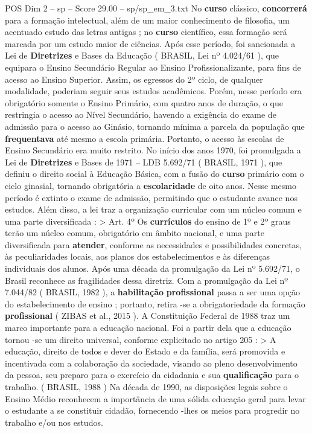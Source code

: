 \begin{textsample}{POS Dim 2 – sp – Score 29.00 – sp/sp\_em\_3.txt}
No \textbf{curso} clássico, \textbf{concorrerá} para a formação intelectual, além de um maior conhecimento de filosofia, um acentuado estudo das letras antigas ; no \textbf{curso} científico, essa formação será marcada por um estudo maior de ciências.
Após esse período, foi sancionada a Lei de \textbf{Diretrizes} e Bases da Educação ( BRASIL, Lei nº 4.024/61 ), que equipara o Ensino Secundário Regular ao Ensino Profissionalizante, para fins de acesso ao Ensino Superior.
Assim, os egressos do 2º ciclo, de qualquer modalidade, poderiam seguir seus estudos acadêmicos.
Porém, nesse período era obrigatório somente o Ensino Primário, com quatro anos de duração, o que restringia o acesso ao Nível Secundário, havendo a exigência do exame de admissão para o acesso ao Ginásio, tornando mínima a parcela da população que \textbf{frequentava} até mesmo a escola primária.
Portanto, o acesso às escolas de Ensino Secundário era muito restrito.
No início dos anos 1970, foi promulgada a Lei de \textbf{Diretrizes} e Bases de 1971 – LDB 5.692/71 ( BRASIL, 1971 ), que definiu o direito social à Educação Básica, com a fusão do \textbf{curso} primário com o ciclo ginasial, tornando obrigatória a \textbf{escolaridade} de oito anos.
Nesse mesmo período é extinto o exame de admissão, permitindo que o estudante avance nos estudos.
Além disso, a lei traz a organização curricular com um núcleo comum e uma parte diversificada : > Art. 4º Os \textbf{currículos} do ensino de 1º e 2º graus terão um núcleo comum, obrigatório em âmbito nacional, e uma parte diversificada para \textbf{atender}, conforme as necessidades e possibilidades concretas, às peculiaridades locais, aos planos dos estabelecimentos e às diferenças individuais dos alunos.
Após uma década da promulgação da Lei nº 5.692/71, o Brasil reconhece as fragilidades dessa diretriz.
Com a promulgação da Lei nº 7.044/82 ( BRASIL, 1982 ), a \textbf{habilitação} \textbf{profissional} passa a ser uma opção do estabelecimento de ensino ; portanto, retira -se a obrigatoriedade da formação \textbf{profissional} ( ZIBAS et al., 2015 ).
A Constituição Federal de 1988 traz um marco importante para a educação nacional.
Foi a partir dela que a educação tornou -se um direito universal, conforme explicitado no artigo 205 : > A educação, direito de todos e dever do Estado e da família, será promovida e incentivada com a colaboração da sociedade, visando ao pleno desenvolvimento da pessoa, seu preparo para o exercício da cidadania e sua \textbf{qualificação} para o trabalho. ( BRASIL, 1988 ) Na década de 1990, as disposições legais sobre o Ensino Médio reconhecem a importância de uma sólida educação geral para levar o estudante a se constituir cidadão, fornecendo -lhes os meios para progredir no trabalho e/ou nos estudos.

\end{textsample}
